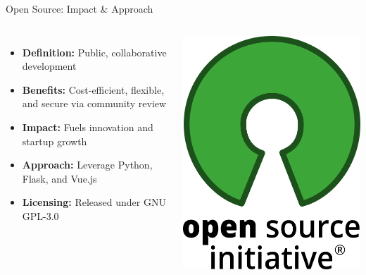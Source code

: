 \documentclass{beamer}
\begin{document}
\begin{frame}{Open Source: Impact \& Approach}
  \begin{columns}
      \begin{itemize}
        \item \textbf{Definition:} Public, collaborative development
        \item \textbf{Benefits:} Cost-efficient, flexible, and secure via community review
        \item \textbf{Impact:} Fuels innovation and startup growth
        \item \textbf{Approach:} Leverage Python, Flask, and Vue.js
        \item \textbf{Licensing:} Released under GNU GPL-3.0
      \end{itemize}
      \centering
      \includegraphics[width=\textwidth]{Open-Source.png}
  \end{columns}
\end{frame}
\end{document}
